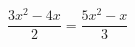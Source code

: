\begin{ex}[type=equation]
	\begin{condition}
		\( \dfrac{3x^2-4x}{2}=\dfrac{5x^2-x}{3} \)
	\end{condition}
\end{ex}